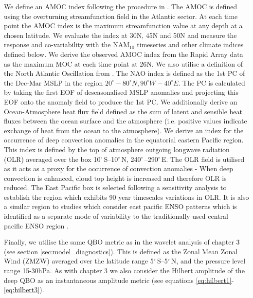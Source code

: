 We define an AMOC index following the procedure in \cite{reichlerStratospheric2012b}. The AMOC is defined using the overturning streamfunction field in the Atlantic sector. At each time point the AMOC index is the maximum streamfunction value at any depth at a chosen latitude. We evaluate the index at 30N, 45N and 50N and measure the response and co-variability with the NAM$_{10}$ timeseries and other climate indices defined below. We derive the observed AMOC index from the Rapid Array data as the maximum MOC at each time point at 26N. We also utilise a definition of the North Atlantic Oscillation from \cite{hurrellNorth2003}. The NAO index is defined as the 1st PC of the Dec-Mar MSLP in the region $20^{\circ}-80^{\circ}N, 90^{\circ}W-40^{\circ}E$. The PC is calculated by taking the first EOF of deseasonalised MSLP anomalies and projecting this EOF onto the anomaly field to produce the 1st PC. We additionally derive an Ocean-Atmosphere heat flux field defined as the sum of latent and sensible heat fluxes between the ocean surface and the atmosphere (i.e. positive values indicate exchange of heat from the ocean to the atmosphere). We derive an index for the occurrence of deep convection anomalies in the equatorial eastern Pacific region. This index is defined by the top of atmosphere outgoing longwave radiation (OLR) averaged over the box 10$^{\circ}$\,S–10$^{\circ}$\,N, 240$^{\circ}$\,–290$^{\circ}$\,E. The OLR field is utilised as it acts as a proxy for the occurrence of convection anomalies - When deep convection is enhanced, cloud top height is increased and therefore OLR is reduced. The East Pacific box is selected following a sensitivity analysis to establish the region which exhibits 90 year timescales variations in OLR. It is also a similar region to studies which consider east pacific ENSO patterns which is identified as a separate mode of variability to the traditionally used central pacific ENSO region \citep{johnsonHow2013f}.

Finally, we utilise the same QBO metric as in the wavelet analysis of chapter 3 (see section \ref{sec:model_diagnostics}). This is defined as the Zonal Mean Zonal Wind (ZMZW) averaged over the latitude range 5$^{\circ}$\,S–5$^{\circ}$\,N,  and the pressure level range 15-30hPa. As with chapter 3 we also consider the Hilbert amplitude of the deep QBO as an instantaneous amplitude metric (see equations \ref{eq:hilbert1}-\ref{eq:hilbert3}). 

